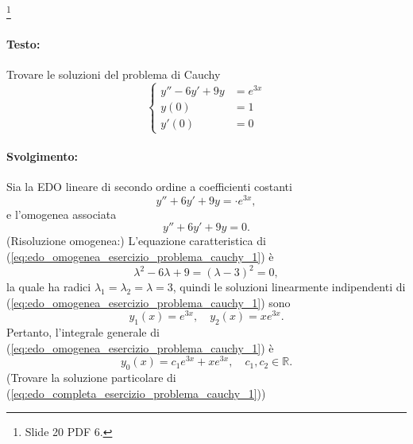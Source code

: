 \begin{example}\footnote{Slide 20 PDF 6.}
	\paragraph{Testo:} Trovare le soluzioni del problema di Cauchy
	\begin{equation*}
		\begin{cases}
			y'' - 6y' + 9 y &= e^{3x}\\
			y(0) &= 1\\
			y'(0) &=0
		\end{cases}
	\end{equation*}
	\paragraph{Svolgimento:} Sia la EDO lineare di secondo ordine a coefficienti costanti
	\begin{equation}\label{eq:edo_completa_esercizio_problema_cauchy_1}
		y'' + 6 y' + 9 y = \cdot e^{3x},
	\end{equation}
	e l'omogenea associata
	\begin{equation}\label{eq:edo_omogenea_esercizio_problema_cauchy_1}
		y'' + 6 y' + 9 y= 0.
	\end{equation}
	(Risoluzione omogenea:) L'equazione caratteristica di (\ref{eq:edo_omogenea_esercizio_problema_cauchy_1}) è
	\begin{equation*}
		\lambda^2 - 6\lambda + 9 = (\lambda -3)^2 = 0,
	\end{equation*}
	la quale ha radici $\lambda_1=\lambda_2=\lambda = 3$, quindi le soluzioni linearmente indipendenti di (\ref{eq:edo_omogenea_esercizio_problema_cauchy_1}) sono
	\begin{equation*}
		y_1(x) = e^{3x},\quad y_2(x) = xe^{3x}.
	\end{equation*}
	Pertanto, l'integrale generale di (\ref{eq:edo_omogenea_esercizio_problema_cauchy_1}) è
	\begin{equation*}
		y_0(x) = c_1 e^{3x} + xe^{3x},\quad c_1,c_2\in\mathbb{R}.
	\end{equation*}
	(Trovare la soluzione particolare di (\ref{eq:edo_completa_esercizio_problema_cauchy_1}))

\end{example}
